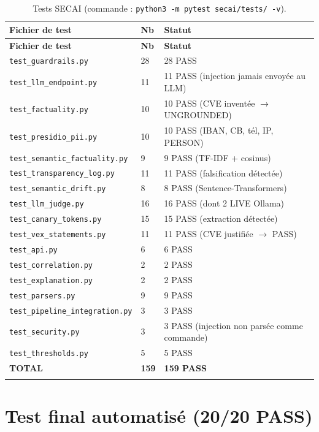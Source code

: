 \documentclass[12pt,a4paper,openany]{report}
\begin{document}
\begin{longtable}{@{}lll@{}}
\toprule
\textbf{Fichier de test} & \textbf{Nb} & \textbf{Statut} \\
\midrule
\endfirsthead
\toprule
\textbf{Fichier de test} & \textbf{Nb} & \textbf{Statut} \\
\midrule
\endhead
\texttt{test\_guardrails.py} & 28 & 28 PASS \\
\texttt{test\_llm\_endpoint.py} & 11 & 11 PASS (injection jamais envoyée au LLM) \\
\texttt{test\_factuality.py} & 10 & 10 PASS (CVE inventée $\rightarrow$ UNGROUNDED) \\
\texttt{test\_presidio\_pii.py} & 10 & 10 PASS (IBAN, CB, tél, IP, PERSON) \\
\texttt{test\_semantic\_factuality.py} & 9 & 9 PASS (TF-IDF + cosinus) \\
\texttt{test\_transparency\_log.py} & 11 & 11 PASS (falsification détectée) \\
\texttt{test\_semantic\_drift.py} & 8 & 8 PASS (Sentence-Transformers) \\
\texttt{test\_llm\_judge.py} & 16 & 16 PASS (dont 2 LIVE Ollama) \\
\texttt{test\_canary\_tokens.py} & 15 & 15 PASS (extraction détectée) \\
\texttt{test\_vex\_statements.py} & 11 & 11 PASS (CVE justifiée $\rightarrow$ PASS) \\
\texttt{test\_api.py} & 6 & 6 PASS \\
\texttt{test\_correlation.py} & 2 & 2 PASS \\
\texttt{test\_explanation.py} & 2 & 2 PASS \\
\texttt{test\_parsers.py} & 9 & 9 PASS \\
\texttt{test\_pipeline\_integration.py} & 3 & 3 PASS \\
\texttt{test\_security.py} & 3 & 3 PASS (injection non parsée comme commande) \\
\texttt{test\_thresholds.py} & 5 & 5 PASS \\
\midrule
\textbf{TOTAL} & \textbf{159} & \textbf{159 PASS} \\
\bottomrule
\caption{Tests SECAI (commande : \texttt{python3 -m pytest secai/tests/ -v}).}
\label{tab:tests-secai}
\end{longtable}

\section{Test final automatisé (20/20 PASS)}
\end{document}
